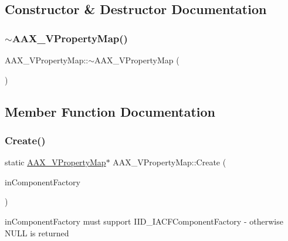 \subsection{Constructor \& Destructor Documentation}
\mbox{\label{a01937_a7f41763fef1dffacb2c1cf926f9a1ec3}} 
\subsubsection{\texorpdfstring{$\sim$AAX\_VPropertyMap()}{~AAX\_VPropertyMap()}}
{\footnotesize\ttfamily A\+A\+X\+\_\+\+V\+Property\+Map\+::$\sim$\+A\+A\+X\+\_\+\+V\+Property\+Map (\begin{DoxyParamCaption}\item[{void}]{ }\end{DoxyParamCaption})}



\subsection{Member Function Documentation}
\mbox{\label{a01937_aba5b47a7e19b6a1d393d810fee736a6a}} 
\subsubsection{\texorpdfstring{Create()}{Create()}}
{\footnotesize\ttfamily static \mbox{\hyperlink{a01937}{A\+A\+X\+\_\+\+V\+Property\+Map}}$\ast$ A\+A\+X\+\_\+\+V\+Property\+Map\+::\+Create (\begin{DoxyParamCaption}\item[{\mbox{\hyperlink{a01409}{I\+A\+C\+F\+Unknown}} $\ast$}]{in\+Component\+Factory }\end{DoxyParamCaption})\hspace{0.3cm}{\ttfamily [static]}}



{\ttfamily in\+Component\+Factory} must support {\ttfamily I\+I\+D\+\_\+\+I\+A\+C\+F\+Component\+Factory} -\/ otherwise N\+U\+LL is returned 

\mbox{\label{a01937_ad6a5cb530373fb938a3dc0c7d5baf874}} 
